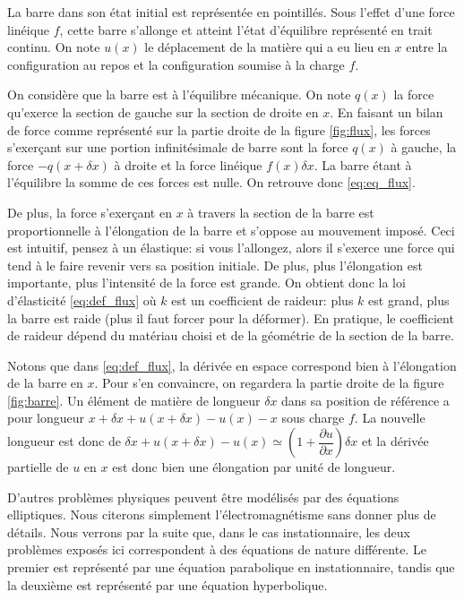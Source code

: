 \documentclass[12pt,a4paper,twoside]{article}
\begin{document}
La barre dans son \'etat initial est repr\'esent\'ee en pointill\'es.
Sous l'effet d'une force lin\'eique $f$, cette barre s'allonge
et atteint l'\'etat d'\'equilibre repr\'esent\'e en trait continu.
On note $u(x)$ le d\'eplacement de la mati\`ere qui a eu lieu en $x$ entre
la configuration au repos et la configuration soumise \`a la charge $f$.


On consid\`ere que la barre est \`a l'\'equilibre m\'ecanique.
On note $q(x)$ la force qu'exerce la section de gauche sur la section de droite
en $x$. En faisant un bilan de force comme repr\'esent\'e 
sur la partie droite de la figure \ref{fig:flux},
les forces s'exer\c{c}ant sur une portion infinit\'esimale de barre sont
la force $q(x)$ \`a gauche, la force $-q(x+\delta x)$ \`a droite
et la force lin\'eique $f(x) \delta x$. La barre \'etant \`a l'\'equilibre la somme de ces forces
est nulle. On retrouve donc \eqref{eq:eq_flux}.


De plus, la force s'exer\c{c}ant en $x$ \`a travers la section de la barre est 
proportionnelle \`a l'\'elongation de la barre et s'oppose au mouvement impos\'e.
Ceci est intuitif, pensez \`a un \'elastique: si vous l'allongez, alors il s'exerce une force
qui tend \`a le faire revenir vers sa position initiale. De plus, plus l'\'elongation
est importante, plus l'intensit\'e de la force est grande.
On obtient donc la loi d'\'elasticit\'e \eqref{eq:def_flux}
o\`u $k$ est un coefficient de raideur:
plus $k$ est grand, plus la barre est raide (plus il faut forcer pour la d\'eformer).
En pratique, le coefficient de raideur d\'epend du mat\'eriau choisi et
de la g\'eom\'etrie de la section de la barre.

Notons que dans \eqref{eq:def_flux}, la d\'eriv\'ee en espace correspond bien \`a 
l'\'elongation de la barre en $x$. Pour s'en convaincre, on regardera la 
partie droite de la figure \ref{fig:barre}. Un \'el\'ement de mati\`ere de longueur
$\delta x$ dans sa position de r\'ef\'erence a pour longueur 
$x + \delta x + u(x+\delta x) - u(x) - x$ sous charge $f$.
La nouvelle longueur est donc de $\delta x + u(x+\delta x) - u(x) 
\simeq \left(1 + \dfrac{\partial u}{\partial x} \right) \delta x$
et la d\'eriv\'ee partielle de $u$ en $x$ est donc bien une \'elongation par unit\'e de longueur.


D'autres probl\`emes physiques peuvent \^etre mod\'elis\'es par des \'equations elliptiques.
Nous citerons simplement l'\'electromagn\'etisme sans donner plus de d\'etails.
Nous verrons par la suite que, dans le cas instationnaire,
les deux probl\`emes expos\'es ici correspondent \`a 
des \'equations de nature diff\'erente.
Le premier est repr\'esent\'e par une \'equation parabolique en instationnaire,
tandis que la deuxi\`eme est repr\'esent\'e par une \'equation hyperbolique.
\end{document}
